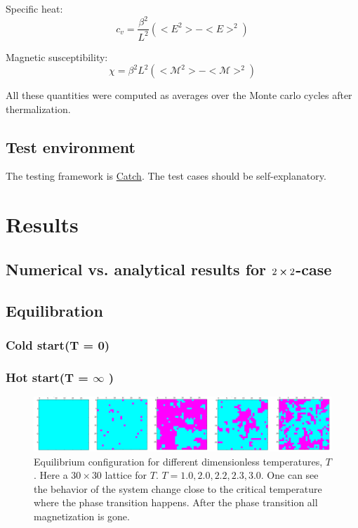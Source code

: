 \documentclass[11pt,a4paper,english]{article}
\numberwithin{equation}{section}
\newcommand{\magM}{\mathcal{M}}
\begin{document}
Specific heat:
\begin{equation}
c_v = \frac{\beta^2}{L^2}(<E^2> - <E>^2)
\end{equation}

Magnetic susceptibility:
\begin{equation}
\chi = \beta^2 L^2 (<\magM^2> - <\magM>^2)
\end{equation}

All these quantities were computed as averages over the Monte carlo cycles after thermalization. 

\subsection{Test environment}

The testing framework is \href{https://github.com/philsquared/Catch}{Catch}.
The test cases should be self-explanatory.


\section{Results}

\subsection{Numerical vs. analytical results for $2\cross2$-case}

\subsection{Equilibration}

\subsubsection{Cold start(T = 0)}

\subsubsection{Hot start(T = $\infty$ )}

\begin{figure}[H]
\centering
\includegraphics[scale=0.10]{pics/equilibrium_different_temperatures.png}
\caption{Equilibrium configuration for different dimensionless temperatures, $T$. Here a $30 \times 30$ lattice for $T$.  $T=1.0, 2.0, 2.2, 2.3, 3.0$. One can see the behavior of the system change close to the critical temperature where the phase transition happens. After the phase transition all magnetization is gone.} 
\label{fig:spin_neighbours}
\end{figure}
\end{document}
